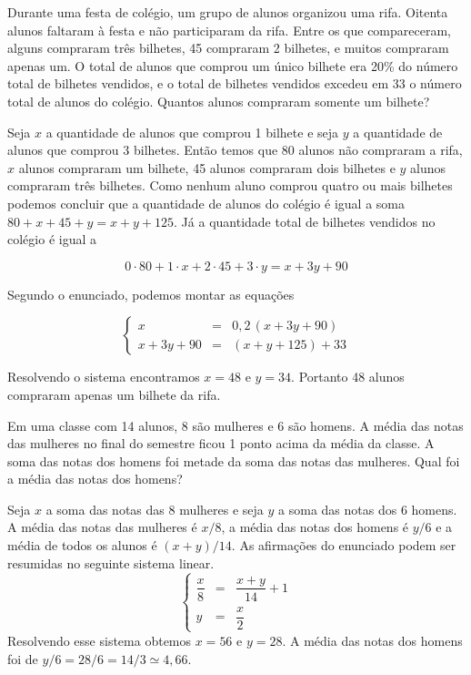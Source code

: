 \begin{problem}
Durante uma festa de colégio, um grupo de alunos organizou uma rifa. Oitenta alunos faltaram à festa e não participaram da rifa.
Entre os que compareceram, alguns compraram três bilhetes, 45 compraram 2 bilhetes, e muitos compraram apenas um.
O total de alunos que comprou um único bilhete era 20\% do número total de bilhetes vendidos, e o total de bilhetes vendidos excedeu em 33 o número total de alunos do colégio. Quantos alunos compraram somente um bilhete?
\end{problem}
\begin{solution}
Seja $x$ a quantidade de alunos que comprou 1 bilhete e seja $y$ a quantidade de alunos que comprou 3 bilhetes.
Então temos que 80 alunos não compraram a rifa, $x$ alunos compraram um bilhete, 45 alunos compraram dois bilhetes e $y$ alunos compraram três bilhetes. Como nenhum aluno comprou quatro ou mais bilhetes podemos concluir que a quantidade de alunos do colégio é igual a soma
$80+x+45+y = x+y+125$. Já a quantidade total de bilhetes vendidos no colégio é igual a 

$$0 \cdot 80  +  1 \cdot x  +  2 \cdot 45  +  3 \cdot y = x+3y+90 $$

Segundo o enunciado, podemos montar as equações

$$\left\{ \begin{array}{ccc}
x        & = &  0,2 \, (x+3y+90)  \\[5pt]
x+3y+90  & = & (x+y+125) + 33  \end{array}\right.$$

Resolvendo o sistema encontramos $x=48$ e $y=34$. Portanto 48 alunos compraram apenas um bilhete da rifa.
\end{solution}

\begin{problem}
Em uma classe com 14 alunos, 8 são mulheres e 6 são homens. A média das notas das mulheres no final do semestre ficou 1 ponto acima da média da classe. A soma das notas dos homens foi metade da soma das notas das mulheres. Qual foi a média das notas dos homens?
\end{problem}
\begin{solution}
Seja $x$ a soma das notas das 8 mulheres e seja $y$ a soma das notas dos 6 homens.
A média das notas das mulheres é $x/8$, a média das notas dos homens é $y/6$ e a média de todos os alunos é $(x+y)/14$.
As afirmações do enunciado podem ser resumidas no seguinte sistema linear.
$$\left\{ \begin{array}{ccc}
\dfrac{x}{8}    & = &    \dfrac{x+y}{14} + 1   \\[10pt]
y               & = &    \dfrac{x}{2}           \end{array}\right.$$
Resolvendo esse sistema obtemos $x=56$ e $y=28$. A média das notas dos homens foi de $y/6 = 28/6 = 14/3 \simeq 4,66$.
\end{solution}

